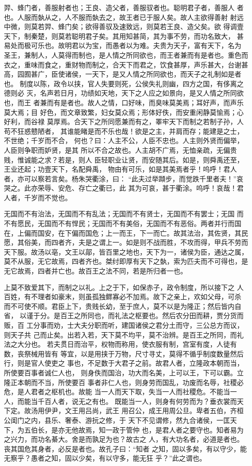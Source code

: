\documentclass[]{article}
\begin{document}
羿、蜂门者，善服射者也；王良、造父者，善服驭者也。聪明君子者，善服人
者也。人服而埶从之，人不服而埶去之，故王者已于服人矣。故人主欲得善射
射远中微，则莫若羿、蜂门矣；欲得善驭及速致远，则莫若王良、造父矣。欲
得调壹天下，制秦楚，则莫若聪明君子矣。其用知甚简，其为事不劳，而功名致大，
甚易处而极可乐也。故明君以为宝，而愚者以为难。夫贵为天子，富有天下，名为
圣王，兼制人，人莫得而制也，是人情之所同欲也，而王者兼而有是者也。重色而
衣之，重味而食之，重财物而制之，合天下而君之，饮食甚厚，声乐甚大，台谢甚
高，园囿甚广，臣使诸侯，一天下，是又人情之所同欲也，而天子之礼制如是者也。
制度以陈，政令以挟，官人失要则死，公侯失礼则幽，四方之国，有侈离之德则必
灭，名声若日月，功绩如天地，天下之人应之如景向，是又人情之所同欲也，而王
者兼而有是者也。故人之情，口好味，而臭味莫美焉；耳好声，而声乐莫大焉；目
好色，而文章致繁，妇女莫众焉；形体好佚，而安重闲静莫愉焉；心好利，而谷禄
莫厚焉。合天下之所同愿兼而有之，睪牢天下而制之若制子孙，人苟不狂惑戆陋者，
其谁能睹是而不乐也哉！欲是之主，并肩而存；能建是之士，不世绝；千岁而不合，
何也？曰：人主不公，人臣不忠也。人主则外贤而偏举，人臣则争职而妒贤，是其
所以不合之故也。人主胡不广焉，无恤亲疏，无偏贵贱，惟诚能之求？若是，则人
臣轻职业让贤，而安随其后。如是，则舜禹还至，王业还起；功壹天下，名配舜禹，
物由有可乐，如是其美焉者乎！呜呼！君人者，亦可以察若言矣。杨朱哭衢涂，曰：
``此夫过举蹞步，而觉跌千里者夫！''哀哭之。此亦荣辱、安危、存亡之衢已，此
其为可哀，甚于衢涂。呜呼！哀哉！君人者，千岁而不觉也。

无国而不有治法，无国而不有乱法；无国而不有贤士，无国而不有罢士；无国
而不有愿民，无国而不有悍民；无国而不有美俗，无国而不有恶俗。两者并行而国
在，上偏而国安，在下偏而国危；上一而王，下一而亡。故其法治，其佐贤，其民
愿，其俗美，而四者齐，夫是之谓上一。如是则不战而胜，不攻而得，甲兵不劳而
天下服。故汤以亳，文王以鄗，皆百里之地也，天下为一，诸侯为臣，通达之属，
莫不从服，无它故焉，四者齐也。桀纣即厚有天下之埶，索为匹夫而不可得也，是
无它故焉，四者并亡也。故百王之法不同，若是所归者一也。

上莫不致爱其下，而制之以礼。上之于下，如保赤子，政令制度，所以接下之
人百姓，有不理者如豪末，则虽孤独鳏寡必不加焉。故下之亲上，欢如父母，可杀
而不可使不顺。君臣上下，贵贱长幼，至于庶人，莫不以是为隆正；然后皆内自省，
以谨于分。是百王之所同也，而礼法之枢要也。然后农分田而耕，贾分货而贩，百
工分事而劝，士大夫分职而听，建国诸侯之君分土而守，三公总方而议，则天子共
己而止矣。出若入若，天下莫不均平，莫不治辨。是百王之所同，而礼法之大分也。
若夫贯日而治平，权物而称用，使衣服有制，宫室有度，人徒有数，丧祭械用皆有
等宜，以是用挟于万物，尺寸寻丈，莫得不循乎制度数量然后行，则是官人使吏之
事也，不足数于大君子之前。故君人者，立隆政本朝而当，所使要百事者诚仁人也，
则身佚而国治，功大而名美，上可以王，下可以霸。立隆正本朝而不当，所使要百
事者非仁人也，则身劳而国乱，功废而名辱，社稷必危，是人君者之枢机也。故能
当一人而天下取，失当一人而社稷危。不能当一人，而能当千百人者，说无之有也。
既能当一人，则身有何劳而为？垂衣裳而天下定。故汤用伊尹，文王用吕尚，武王
用召公，成王用周公旦。卑者五伯，齐桓公闺门之内，县乐、奢泰、游抏之修，于
天下不见谓修，然九合诸侯，一匡天下，为五伯长，是亦无他故焉，知一政于管仲
也，是君人者之要守也。知者易为之兴力，而功名綦大。舍是而孰足为也？故古之
人，有大功名者，必道是者也。丧其国危其身者，必反是者也。故孔子曰：``知者
之知，固以多矣，有以守少，能无察乎？愚者之知，固以少矣，有以守多，能无狂
乎？''此之谓也。
\end{document}
